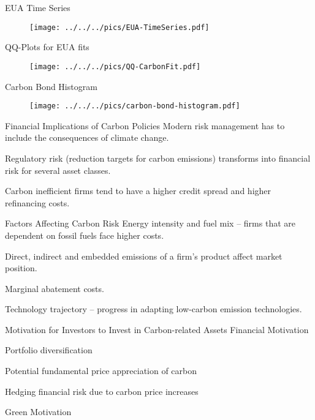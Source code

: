 EUA Time Series
	\begin{figure}[h!]
	\centering
	\texttt{[image: ../../../pics/EUA-TimeSeries.pdf]}
	\label{fig:EUA-TS}
	\end{figure}


QQ-Plots for EUA fits
	\begin{figure}[h!]
	\centering
	\texttt{[image: ../../../pics/QQ-CarbonFit.pdf]}
	\label{fig:EUA-fits}
	\end{figure}


Carbon Bond Histogram
	\begin{figure}[h!]
	\centering
	\texttt{[image: ../../../pics/carbon-bond-histogram.pdf]}
	\label{fig:Carbon-Bond-Histogram}
	\end{figure}


Financial Implications of Carbon Policies
	Modern risk management has to include the consequences of climate change.
	
	Regulatory risk (reduction targets for carbon emissions) transforms into financial risk  for several asset classes.
	
	Carbon inefficient firms tend to have a higher credit spread and higher refinancing costs.


Factors Affecting Carbon Risk
	Energy intensity and fuel mix -- firms that are dependent on fossil fuels face higher costs.
	
	Direct, indirect and embedded emissions of a firm's product affect market position.
	
	Marginal abatement costs.
	
	Technology trajectory -- progress in adapting low-carbon emission technologies.


Motivation for Investors to Invest in Carbon-related Assets
	Financial Motivation

	Portfolio diversification
	
	Potential fundamental price appreciation of carbon
	
	Hedging financial risk due to carbon price increases

	Green Motivation

